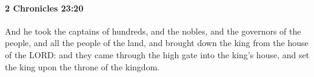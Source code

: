 
		\paragraph{2 Chronicles 23:20} %
			\label{2CHRONICLES-23-20}

			And he took the captains of hundreds, and the nobles, and the governors of the people, and all the people of the land, and brought down the king from the house of the LORD: and they came through the high gate into the king's house, and set the king upon the throne of the kingdom.


